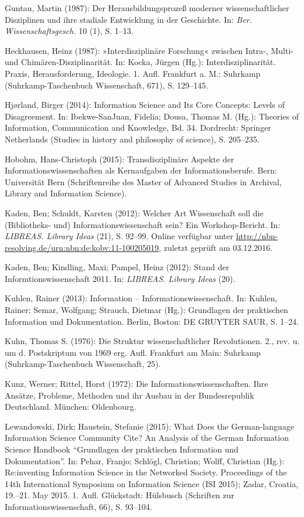 \documentclass[a4paper,
fontsize=11pt,
oneside,
numbers=noperiodatend,
parskip=half-,
bibliography=totoc,
final
]{scrartcl}
\begin{document}
Guntau, Martin (1987): Der Herausbildungsprozeß moderner
wissenschaftlicher Disziplinen und ihre stadiale Entwicklung in der
Geschichte. In: \emph{Ber. Wissenschaftsgesch.} 10 (1), S. 1--13.

Heckhausen, Heinz (1987): »Interdisziplinäre Forschung« zwischen Intra-,
Multi- und Chimären-Disziplinarität. In: Kocka, Jürgen (Hg.):
Interdisziplinarität. Praxis, Herausforderung, Ideologie. 1. Aufl.
Frankfurt a. M.: Suhrkamp (Suhrkamp-Taschenbuch Wissenschaft, 671), S.
129--145.

Hjørland, Birger (2014): Information Science and Its Core Concepts:
Levels of Disagreement. In: Ibekwe-SanJuan, Fidelia; Dousa, Thomas M.
(Hg.): Theories of Information, Communication and Knowledge, Bd. 34.
Dordrecht: Springer Netherlands (Studies in history and philosophy of
science), S. 205--235.

Hobohm, Hans-Christoph (2015): Transdisziplinäre Aspekte der
Informationswissenschaften als Kernaufgaben der Informationsberufe.
Bern: Universität Bern (Schriftenreihe des Master of Advanced Studies in
Archival, Library and Information Science).

Kaden, Ben; Schuldt, Karsten (2012): Welcher Art Wissenschaft soll die
(Bibliotheks- und) Informationswissenschaft sein? Ein Workshop-Bericht.
In: \emph{LIBREAS. Library Ideas} (21), S. 92--99. Online verfügbar
unter \url{http://nbn-resolving.de/urn:nbn:de:kobv:11-100205019},
zuletzt geprüft am 03.12.2016.

Kaden, Ben; Kindling, Maxi; Pampel, Heinz (2012): Stand der
Informtionswissenschaft 2011. In: \emph{LIBREAS. Library Ideas} (20).

Kuhlen, Rainer (2013): Information -- Informationswissenschaft. In:
Kuhlen, Rainer; Semar, Wolfgang; Strauch, Dietmar (Hg.): Grundlagen der
praktischen Information und Dokumentation. Berlin, Boston: DE GRUYTER
SAUR, S. 1--24.

Kuhn, Thomas S. (1976): Die Struktur wissenschaftlicher Revolutionen.
2., rev. u. um d. Postskriptum von 1969 erg. Aufl. Frankfurt am Main:
Suhrkamp (Suhrkamp-Taschenbuch Wissenschaft, 25).

Kunz, Werner; Rittel, Horst (1972): Die Informationswissenschaften. Ihre
Ansätze, Probleme, Methoden und ihr Ausbau in der Bundesrepublik
Deutschland. München: Oldenbourg.

Lewandowski, Dirk; Haustein, Stefanie (2015): What Does the
German-language Information Science Community Cite? An Analysis of the
German Information Science Handbook \enquote{Grundlagen der praktischen
Information und Dokumentation}. In: Pehar, Franjo; Schlögl, Christian;
Wolff, Christian (Hg.): Re:inventing Information Science in the
Networked Society. Proceedings of the 14th International Symposium on
Information Science (ISI 2015); Zadar, Croatia, 19.--21. May 2015. 1.
Aufl. Glückstadt: Hülsbusch (Schriften zur Informationswissenschaft,
66), S. 93--104.
\end{document}
